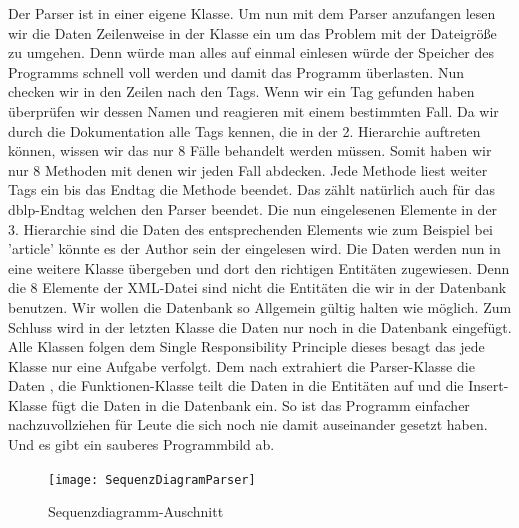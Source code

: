 \documentclass[a4paper,12pt]{article}
\begin{document}
	Der Parser ist in einer eigene Klasse. Um nun mit dem Parser anzufangen lesen wir die Daten Zeilenweise in der Klasse ein um das Problem mit der Dateigröße zu umgehen. Denn würde man alles auf einmal einlesen würde der Speicher des Programms schnell voll werden und damit das Programm überlasten. Nun checken wir in den Zeilen nach den Tags. Wenn wir ein Tag gefunden haben überprüfen wir dessen Namen und reagieren mit einem bestimmten Fall. Da wir durch die Dokumentation alle Tags kennen, die in der 2. Hierarchie auftreten können, wissen wir das nur 8 Fälle behandelt werden müssen. Somit haben wir nur 8 Methoden mit denen wir jeden Fall abdecken. Jede Methode liest weiter Tags ein bis das Endtag die Methode beendet. Das zählt natürlich auch für das dblp-Endtag welchen den Parser beendet. Die nun eingelesenen Elemente in der 3. Hierarchie sind die Daten des entsprechenden Elements wie zum Beispiel bei 'article' könnte es der Author sein der eingelesen wird. Die Daten werden nun in eine weitere Klasse übergeben und dort den richtigen Entitäten zugewiesen. Denn die 8 Elemente der XML-Datei sind nicht die Entitäten die wir in der Datenbank benutzen. Wir wollen die Datenbank so Allgemein gültig halten wie möglich. Zum Schluss wird in der letzten Klasse die Daten nur noch in die Datenbank eingefügt. Alle Klassen folgen dem Single Responsibility Principle dieses besagt das jede Klasse nur eine Aufgabe verfolgt. Dem nach extrahiert die Parser-Klasse die Daten , die Funktionen-Klasse teilt die Daten in die Entitäten auf und die Insert-Klasse fügt die Daten in die Datenbank ein. So ist das Programm einfacher nachzuvollziehen für Leute die sich noch nie damit auseinander gesetzt haben. Und es gibt ein sauberes Programmbild ab.
	
\begin{figure}[!htb]
	\centering
	\texttt{[image: SequenzDiagramParser]}
	\caption{Sequenzdiagramm-Auschnitt}
	\label{fig:sequenzdiagramm}
\end{figure}
	
\end{document}
